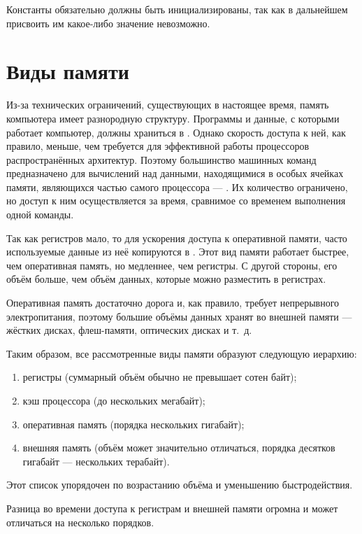 Константы обязательно должны быть инициализированы, так как в
дальнейшем присвоить им какое-либо значение невозможно.

\section{Виды памяти}


Из-за технических ограничений, существующих в настоящее время, память
компьютера имеет разнородную структуру. Программы и данные, с которыми
работает компьютер, должны храниться в
. Однако скорость доступа
к ней, как правило, меньше, чем требуется для эффективной работы
процессоров распространённых архитектур. Поэтому большинство машинных
команд предназначено для вычислений над данными, находящимися в особых
ячейках памяти, являющихся частью самого процессора — . Их количество ограничено, но доступ к ним
осуществляется за время, сравнимое со временем выполнения одной
команды.

Так как регистров мало, то для ускорения доступа к оперативной памяти,
часто используемые данные из неё копируются в .  Этот вид памяти работает быстрее, чем
оперативная память, но медленнее, чем регистры. С другой стороны, его
объём больше, чем объём данных, которые можно разместить в регистрах.

Оперативная память достаточно дорога и, как правило, требует
непрерывного электропитания, поэтому большие объёмы данных хранят во
внешней памяти — жёстких дисках, флеш-памяти, оптических дисках и
т.~д.

Таким образом, все рассмотренные виды памяти образуют следующую
иерархию:
\begin{enumerate}
\item регистры (суммарный объём обычно не превышает сотен байт);
\item кэш процессора (до нескольких мегабайт);
\item оперативная память (порядка нескольких гигабайт);
\item внешняя память (объём может значительно отличаться, порядка
  десятков гигабайт — нескольких терабайт).
\end{enumerate}

Этот список упорядочен по возрастанию объёма и уменьшению
быстродействия.

Разница во времени доступа к регистрам и внешней памяти огромна и
может отличаться на несколько порядков.

